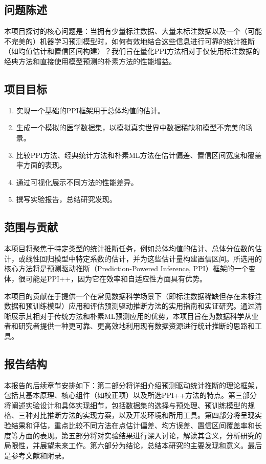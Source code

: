 \documentclass[12pt,a4paper]{article}
\begin{document}
\subsection{问题陈述}
\indent 本项目探讨的核心问题是：当拥有少量标注数据、大量未标注数据以及一个（可能不完美的）机器学习预测模型时，如何有效地结合这些信息进行可靠的统计推断（如均值估计和置信区间构建）？我们旨在量化PPI方法相对于仅使用标注数据的经典方法和直接使用模型预测的朴素方法的性能增益。

\subsection{项目目标}
\begin{enumerate}
    \item 实现一个基础的PPI框架用于总体均值的估计。
    \item 生成一个模拟的医学数据集，以模拟真实世界中数据稀缺和模型不完美的场景。
    \item 比较PPI方法、经典统计方法和朴素ML方法在估计偏差、置信区间宽度和覆盖率方面的表现。
    \item 通过可视化展示不同方法的性能差异。
    \item 撰写实验报告，总结研究发现。
\end{enumerate}

\subsection{范围与贡献}
\label{sec:scope_contribution}
本项目将聚焦于特定类型的统计推断任务，例如总体均值的估计、总体分位数的估计，或线性回归模型中特定系数的估计，并为这些估计量构建置信区间。所选用的核心方法将是预测驱动推断（Prediction-Powered Inference, PPI）框架的一个变体，很可能是PPI++，因为它在效率和自适应性方面具有优势。

本项目的贡献在于提供一个在常见数据科学场景下（即标注数据稀缺但存在未标注数据和预训练模型）应用和评估预测驱动推断方法的实用指南和实证研究。通过清晰展示其相对于传统方法和朴素ML预测应用的优势，本项目旨在为数据科学从业者和研究者提供一种更可靠、更高效地利用现有数据资源进行统计推断的思路和工具。

\subsection{报告结构}
\label{sec:report_structure}
本报告的后续章节安排如下：第二部分将详细介绍预测驱动统计推断的理论框架，包括其基本原理、核心组件（如校正项）以及所选PPI++方法的特点。第三部分将阐述实验设计和具体实现细节，包括数据集的选择与预处理、预训练模型的规格、三种对比推断方法的实现方案，以及开发环境和所用工具。第四部分将呈现实验结果和评估，重点比较不同方法在点估计偏差、均方误差、置信区间覆盖率和长度等方面的表现。第五部分将对实验结果进行深入讨论，解读其含义，分析研究的局限性，并展望未来工作。第六部分为结论，总结本研究的主要发现和意义。最后是参考文献和附录。
\end{document}
